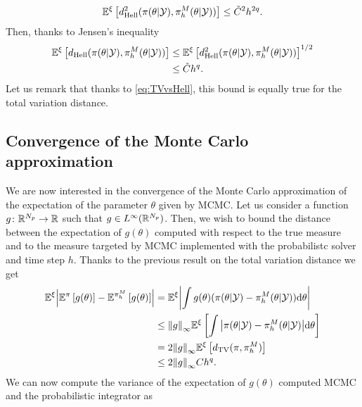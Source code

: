 \begin{equation}
	\mathbb{E}^\xi\left[d_{\mathrm{Hell}}^2(\pi(\theta|\mathcal{Y}),\pi^M_h(\theta|\mathcal{Y}))\right] \leq \tilde C^2 h^{2q}.
\end{equation}
Then, thanks to Jensen's inequality
\begin{equation}
\begin{aligned}
	\mathbb{E}^\xi\left[d_{\mathrm{Hell}}(\pi(\theta|\mathcal{Y}),\pi^M_h(\theta|\mathcal{Y}))\right] &\leq \mathbb{E}^\xi\left[d_{\mathrm{Hell}}^2(\pi(\theta|\mathcal{Y}),\pi^M_h(\theta|\mathcal{Y}))\right]^{1/2} \\
	&\leq \tilde C h^q.
\end{aligned}
\end{equation}
Let us remark that thanks to \eqref{eq:TVvsHell}, this bound is equally true for the total variation distance. 

\subsection{Convergence of the Monte Carlo approximation}\label{sec:ParH}
We are now interested in the convergence of the Monte Carlo approximation of the expectation of the parameter $\theta$ given by MCMC. Let us consider a function $g \colon \mathbb{R}^{N_p} \to \mathbb{R}$ such that $g \in L^\infty(\mathbb{R}^{N_p})$. Then, we wish to bound the distance between the expectation of $g(\theta)$ computed with respect to the true measure and to the measure targeted by MCMC implemented with the probabilistc solver and time step $h$. Thanks to the previous result on the total variation distance we get
\begin{equation}
\begin{aligned}
	\mathbb{E}^\xi\abs{\mathbb{E}^\pi\left[g(\theta)\right] - \mathbb{E}^{\pi_h^M}\left[g(\theta)\right]} &= \mathbb{E}^\xi\abs{\int g(\theta)(\pi(\theta|\mathcal{Y}) - \pi_h^M(\theta|\mathcal{Y}))\dd \theta}\\
	&\leq \norm{g}_\infty \mathbb{E}^\xi \left[\int \abs{\pi(\theta|\mathcal{Y}) - \pi_h^M(\theta|\mathcal{Y})} \dd \theta\right] \\
	&= 2 \norm{g}_\infty \mathbb{E}^\xi\left[d_{\mathrm{TV}}(\pi, \pi_h^M)\right] \\
	&\leq 2 \norm{g}_\infty C h^{q}.
\end{aligned}
\end{equation}
We can now compute the variance of the expectation of $g(\theta)$ computed MCMC and the probabilistic integrator as
